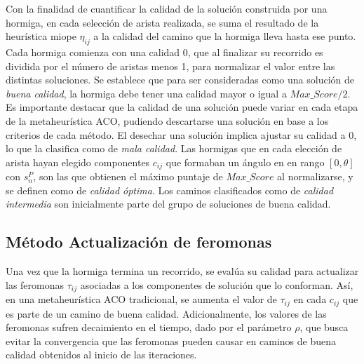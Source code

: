 Con la finalidad de cuantificar la calidad de la soluci\'on construida por una hormiga, en cada selecci\'on de arista realizada, se suma el resultado de la heur\'istica miope $\eta_{ij}$ a la calidad del camino que la hormiga lleva hasta ese punto. Cada hormiga comienza con una calidad 0, que al finalizar su recorrido es dividida por el n\'umero de aristas menos 1, para normalizar el valor entre las distintas soluciones. Se establece que para ser consideradas como una soluci\'on de {\it buena calidad}, la hormiga debe tener una calidad mayor o igual a $Max\_Score/2$. Es importante destacar que la calidad de una soluci\'on puede variar en cada etapa de la metaheur\'istica ACO, pudiendo descartarse una soluci\'on en base a los criterios de cada m\'etodo. El desechar una soluci\'on implica ajustar su calidad a 0, lo que la clasifica como de {\it mala calidad}. Las hormigas que en cada elecci\'on de arista hayan elegido componentes $c_{ij}$ que formaban un \'angulo en en rango $[0, \theta]$ con $s_{n}^{P}$, son las que obtienen el m\'aximo puntaje de $Max\_Score$ al normalizarse, y se definen como de {\it calidad \'optima}. Los caminos clasificados como de {\it calidad intermedia} son inicialmente parte del grupo de soluciones de buena calidad.






\subsection{M\'etodo Actualizaci\'on de feromonas}
\label{subsec:pheroUpdate}
Una vez que la hormiga termina un recorrido, se eval\'ua su calidad para actualizar las feromonas $\tau_{ij}$ asociadas a los componentes de soluci\'on que lo conforman. As\'i, en una metaheur\'istica ACO tradicional, se aumenta el valor de $\tau_{ij}$ en cada $c_{ij}$ que es parte de un camino de buena calidad. Adicionalmente, los valores de las feromonas sufren decaimiento en el tiempo, dado por el par\'ametro $\rho$, que busca evitar la convergencia que las feromonas pueden causar en caminos de buena calidad obtenidos al inicio de las iteraciones.


